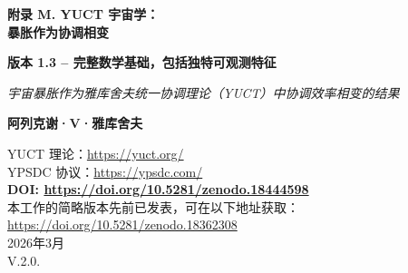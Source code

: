 \documentclass[12pt]{article}
\theoremstyle{remark}
\newcommand{\Keff}{K_{\mathrm{eff}}}
\begin{document}
	
	\begin{titlepage}
		\begin{center}
			\vspace*{0cm}
			
			\Huge\textbf{附录 M. YUCT 宇宙学：\\ 暴胀作为协调相变}
			
			\vspace{0.5cm}
			
			\Large\textbf{版本 1.3 – 完整数学基础，包括独特可观测特征}
			
			\vspace{0.5cm}
			
			\large\textit{宇宙暴胀作为雅库舍夫统一协调理论（YUCT）中协调效率相变的结果}
			
			\vspace{0.5cm}
			
			\normalsize\textbf{阿列克谢·V·雅库舍夫}
			
			YUCT 理论：\url{https://yuct.org/}\\
			YPSDC 协议：\url{https://ypsdc.com/}\\
			
			\vspace{1.5cm}
			\textbf{DOI: \url{https://doi.org/10.5281/zenodo.18444598}}\\
			
			\vspace{0.5cm}
			本工作的简略版本先前已发表，可在以下地址获取：\\ \url{https://doi.org/10.5281/zenodo.18362308}\\
			\vspace{0.5cm}
			2026年3月 \\ \large V.2.0.
			
			\newpage
			\begin{abstract}
				\noindent
				本附录在雅库舍夫统一协调理论（YUCT）框架内，给出了宇宙暴胀阶段作为协调效率 $\Keff$ 的相变的完整数学描述。研究表明，在早期宇宙中，当 $\Keff \ll 1$ 时，协调场 $\Psi_{MN}$ 处于对称相。随着宇宙冷却，发生相变，伴随着 $\Keff$ 急剧增加至 $\Keff \gg 1$，从而产生指数膨胀（暴胀），而无需引入基本标量场（暴胀子）。有效势从 19 维 YUCT 拉格朗日量导出，并继承了词典的分形结构。通用误差标度指数 $\beta = 0.67$（附录 L）在确定暴胀参数中起关键作用。获得了标量谱指数 $n_s$ 和张量标量比 $r$ 的表达式，这些表达式与普朗克数据一致，并为未来实验（CMB‑S4、LiteBIRD、Euclid）提供了具体预测。暴胀之后，协调场凝聚体衰变成粒子，使宇宙充满物质；这一过程的效率也取决于 $\beta$，将核合成与相同的分形标度联系起来。此外，我们识别了 YUCT 暴胀的独特可观测特征，使其有别于其他模型：固定的局部非高斯性 $f_{\text{NL}}^{\text{local}} \approx 1.12$、$f_{\text{NL}}$ 与 $r$ 之间的特定关系、双谱的特征形状以及张量功率谱中可能的振荡。提出了检验暴胀协调性质的实验方案。
			\end{abstract}
			

\end{center}
\end{titlepage}
\end{document}
